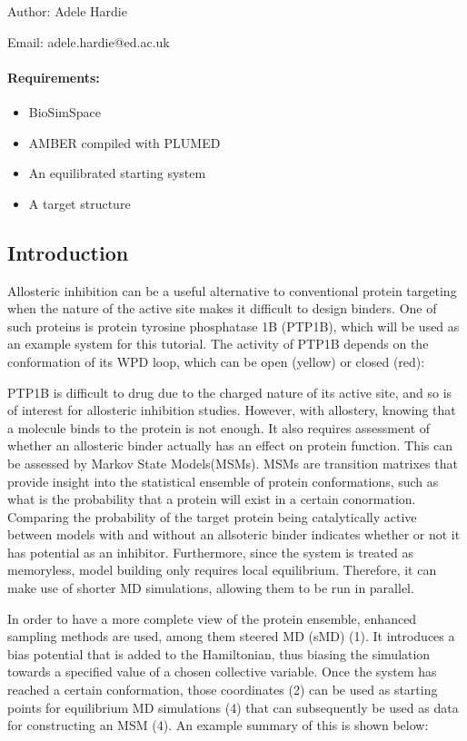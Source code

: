 Author: Adele Hardie

Email: adele.hardie@ed.ac.uk

\hypertarget{requirements}{%
\paragraph{Requirements:}\label{requirements}}

\begin{itemize}
\tightlist
\item
  BioSimSpace
\item
  AMBER compiled with PLUMED
\item
  An equilibrated starting system
\item
  A target structure
\end{itemize}

\hypertarget{introduction}{%
\subsection{Introduction}\label{introduction}}

Allosteric inhibition can be a useful alternative to conventional
protein targeting when the nature of the active site makes it difficult
to design binders. One of such proteins is protein tyrosine phosphatase
1B (PTP1B), which will be used as an example system for this tutorial.
The activity of PTP1B depends on the conformation of its WPD loop, which
can be open (yellow) or closed (red):

PTP1B is difficult to drug due to the charged nature of its active site,
and so is of interest for allosteric inhibition studies. However, with
allostery, knowing that a molecule binds to the protein is not enough.
It also requires assessment of whether an allosteric binder actually has
an effect on protein function. This can be assessed by Markov State
Models(MSMs). MSMs are transition matrixes that provide insight into the
statistical ensemble of protein conformations, such as what is the
probability that a protein will exist in a certain conormation.
Comparing the probability of the target protein being catalytically
active between models with and without an allsoteric binder indicates
whether or not it has potential as an inhibitor. Furthermore, since the
system is treated as memoryless, model building only requires local
equilibrium. Therefore, it can make use of shorter MD simulations,
allowing them to be run in parallel.

In order to have a more complete view of the protein ensemble, enhanced
sampling methods are used, among them steered MD (sMD) (1). It
introduces a bias potential that is added to the Hamiltonian, thus
biasing the simulation towards a specified value of a chosen collective
variable. Once the system has reached a certain conformation, those
coordinates (2) can be used as starting points for equilibrium MD
simulations (4) that can subsequently be used as data for constructing
an MSM (4). An example summary of this is shown below:

